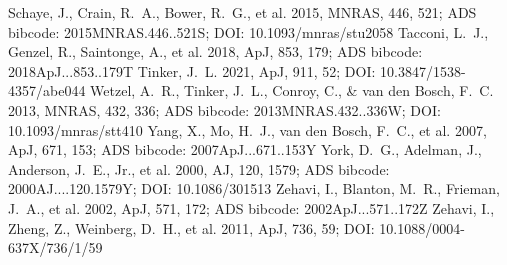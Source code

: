 \documentclass[twocolumn]{aastex631}
\begin{document}
\begin{thebibliography}{}
 Schaye, J., Crain, R.~A., Bower, R.~G., et al. 2015, MNRAS, 446, 521; ADS bibcode: 2015MNRAS.446..521S; DOI: 10.1093/mnras/stu2058
 Tacconi, L.~J., Genzel, R., Saintonge, A., et al. 2018, ApJ, 853, 179; ADS bibcode: 2018ApJ...853..179T
 Tinker, J.~L. 2021, ApJ, 911, 52; DOI: 10.3847/1538-4357/abe044
 Wetzel, A.~R., Tinker, J.~L., Conroy, C., \& van den Bosch, F.~C. 2013, MNRAS, 432, 336; ADS bibcode: 2013MNRAS.432..336W; DOI: 10.1093/mnras/stt410
 Yang, X., Mo, H.~J., van den Bosch, F.~C., et al. 2007, ApJ, 671, 153; ADS bibcode: 2007ApJ...671..153Y
 York, D.~G., Adelman, J., Anderson, J.~E., Jr., et al. 2000, AJ, 120, 1579; ADS bibcode: 2000AJ....120.1579Y; DOI: 10.1086/301513
 Zehavi, I., Blanton, M.~R., Frieman, J.~A., et al. 2002, ApJ, 571, 172; ADS bibcode: 2002ApJ...571..172Z
 Zehavi, I., Zheng, Z., Weinberg, D.~H., et al. 2011, ApJ, 736, 59; DOI: 10.1088/0004-637X/736/1/59
\end{thebibliography}
\end{document}
